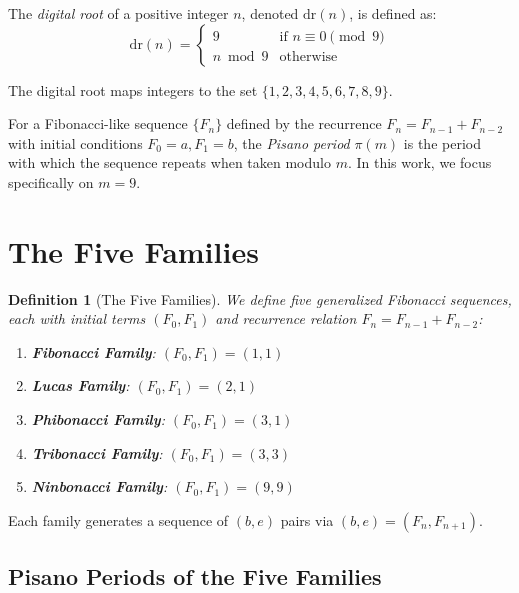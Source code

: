 \documentclass[12pt]{article}
\newtheorem{definition}{Definition}
\begin{document}
The \emph{digital root} of a positive integer $n$, denoted $\text{dr}(n)$, is defined as:
\begin{equation}
\text{dr}(n) = \begin{cases}
9 & \text{if } n \equiv 0 \pmod{9} \\
n \bmod 9 & \text{otherwise}
\end{cases}
\end{equation}

The digital root maps integers to the set $\{1, 2, 3, 4, 5, 6, 7, 8, 9\}$.

For a Fibonacci-like sequence $\{F_n\}$ defined by the recurrence $F_n = F_{n-1} + F_{n-2}$ with initial conditions $F_0 = a, F_1 = b$, the \emph{Pisano period} $\pi(m)$ is the period with which the sequence repeats when taken modulo $m$. In this work, we focus specifically on $m = 9$.

\section{The Five Families}

\begin{definition}[The Five Families]
We define five generalized Fibonacci sequences, each with initial terms $(F_0, F_1)$ and recurrence relation $F_n = F_{n-1} + F_{n-2}$:

\begin{enumerate}
\item \textbf{Fibonacci Family}: $(F_0, F_1) = (1, 1)$
\item \textbf{Lucas Family}: $(F_0, F_1) = (2, 1)$
\item \textbf{Phibonacci Family}: $(F_0, F_1) = (3, 1)$
\item \textbf{Tribonacci Family}: $(F_0, F_1) = (3, 3)$
\item \textbf{Ninbonacci Family}: $(F_0, F_1) = (9, 9)$
\end{enumerate}
\end{definition}

Each family generates a sequence of $(b, e)$ pairs via $(b, e) = (F_n, F_{n+1})$.

\subsection{Pisano Periods of the Five Families}
\end{document}
